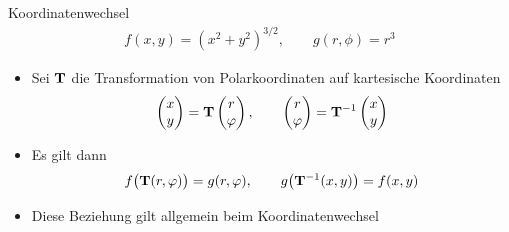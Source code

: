 \begin{frame}{Koordinatenwechsel}
  \begin{gather*}
    f(x,y) = \left(x^2+y^2\right)^{3/2},\qquad g(r,\phi) = r^3
  \end{gather*}
  \begin{itemize}
  \item Sei $\mathbf{T}$ die Transformation von Polarkoordinaten auf kartesische Koordinaten
    \begin{gather*}
      \begin{pmatrix}
        x\\y
      \end{pmatrix}
      = \mathbf{T}
      \begin{pmatrix}
        r\\\varphi
      \end{pmatrix},
      \qquad
      \begin{pmatrix}
        r\\\varphi
      \end{pmatrix}
      = \mathbf{T}^{-1}
      \begin{pmatrix}
        x\\y
      \end{pmatrix}
    \end{gather*}
  \item Es gilt dann
    \begin{gather*}
      f\bigl(\mathbf{T}(r,\varphi)\bigr) = g(r,\varphi),\qquad
      g\bigl(\mathbf{T}^{-1}(x,y)\bigr) = f(x,y)
    \end{gather*}
  \item Diese Beziehung gilt allgemein beim Koordinatenwechsel
  \end{itemize}
\end{frame}


